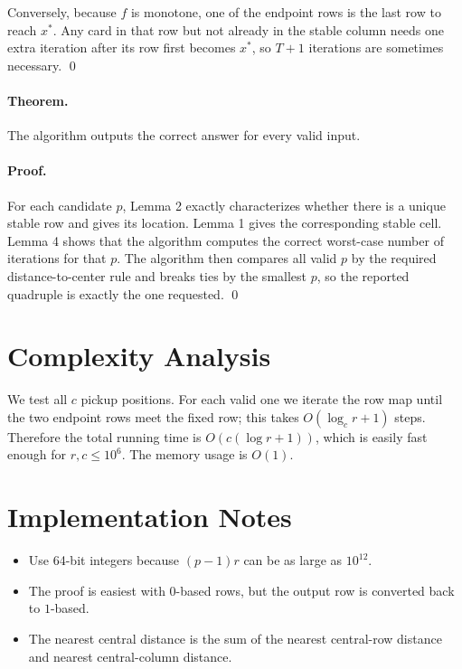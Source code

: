 \documentclass[11pt]{article}
\begin{document}
Conversely, because $f$ is monotone, one of the endpoint rows is the last row to reach $x^*$. Any card in
that row but not already in the stable column needs one extra iteration after its row first becomes $x^*$,
so $T+1$ iterations are sometimes necessary. \qed

\paragraph{Theorem.}
The algorithm outputs the correct answer for every valid input.

\paragraph{Proof.}
For each candidate $p$, Lemma 2 exactly characterizes whether there is a unique stable row and gives its
location. Lemma 1 gives the corresponding stable cell. Lemma 4 shows that the algorithm computes the
correct worst-case number of iterations for that $p$. The algorithm then compares all valid $p$ by the
required distance-to-center rule and breaks ties by the smallest $p$, so the reported quadruple is exactly
the one requested. \qed

\section*{Complexity Analysis}

We test all $c$ pickup positions. For each valid one we iterate the row map until the two endpoint rows
meet the fixed row; this takes $O(\log_c r + 1)$ steps. Therefore the total running time is
$O(c(\log r + 1))$, which is easily fast enough for $r,c \le 10^6$. The memory usage is $O(1)$.

\section*{Implementation Notes}

\begin{itemize}[leftmargin=*]
    \item Use 64-bit integers because $(p-1)r$ can be as large as $10^{12}$.
    \item The proof is easiest with $0$-based rows, but the output row is converted back to $1$-based.
    \item The nearest central distance is the sum of the nearest central-row distance and nearest
    central-column distance.
\end{itemize}
\end{document}
